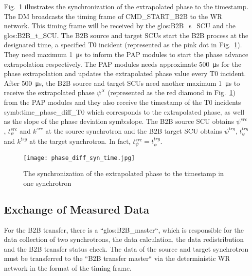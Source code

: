 Fig.~\ref{phase_diff_syn_time} illustrates the synchronization of the extrapolated phase to the timestamp. The DM broadcasts the timing frame of CMD\_START\_B2B to the WR network. This timing frame will be received by the \gls{glos:B2B_s_SCU} and the \gls{glos:B2B_t_SCU}. The B2B source and target SCUs start the B2B process at the designated time, a specified T0 incident (represented as the pink dot in Fig.~\ref{phase_diff_syn_time}). They need maximum \SI{1}{\us} to inform the PAP modules to start the phase advance extrapolation respectively. The PAP modules needs approximate \SI{500}{\us} for the phase extrapolation and updates the extrapolated phase value every T0 incident. After \SI{500}{\us}, the B2B source and target SCUs need another maximum \SI{1}{\us} to receive the extrapolated phase $\psi^X$ (represented as the red diamond in Fig.~\ref{phase_diff_syn_time}) from the PAP modules and they also receive the timestamp of the T0 incidents \gls{symb:time_phase_diff_T0} which corresponds to the extrapolated phase, as well as the slope of the phase deviation \gls{symb:slope}. The B2B source SCU obtains $\psi^\mathit{src}$, $t_\psi^\mathit{src}$ and $k^\mathit{src}$ at the source synchrotron and the B2B target SCU obtains $\psi^\mathit{trg}$, $t_\psi^\mathit{trg}$ and $k^\mathit{trg}$ at the target synchrotron. In fact, $t_\psi^\mathit{src}=t_\psi^\mathit{trg}$.
 \begin{figure}[!htb]
   \centering   
   \texttt{[image: phase\_diff\_syn\_time.jpg]}
   \caption{The synchronization of the extrapolated phase to the timestamp in one synchrotron}
   \label{phase_diff_syn_time}
\end{figure}
\subsection{Exchange of Measured Data}

For the B2B transfer, there is a ``\gls{glos:B2B_master}``, which is responsible for the data collection of two synchrotrons, the data calculation, the data redistribution and the B2B transfer status check. The data of the source and target synchrotron must be transferred to the ``B2B transfer master`` via the deterministic WR network in the format of the timing frame.
 
